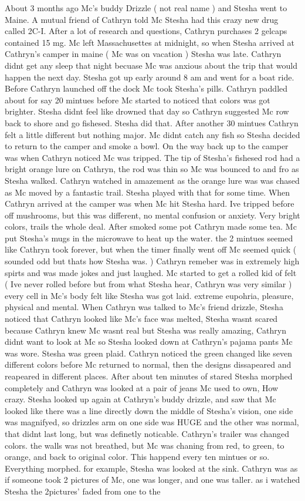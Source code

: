 \documentclass[12pt]{book}
\begin{document}
About 3 months ago Mc's buddy Drizzle ( not real name ) and Stesha went to Maine. A mutual friend of Cathryn told Mc Stesha had this crazy new drug called 2C-I. After a lot of research and questions, Cathryn purchases 2 gelcaps contained 15 mg. Mc left Massachusettes at midnight, so when Stesha arrived at Cathryn's camper in maine ( Mc was on vacation ) Stesha was late. Cathryn didnt get any sleep that night becuase Mc was anxious about the trip that would happen the next day. Stesha got up early around 8 am and went for a boat ride. Before Cathryn launched off the dock Mc took Stesha's pills. Cathryn paddled about for say 20 mintues before Mc started to noticed that colors was got brighter. Stesha didnt feel like drowned that day so Cathryn suggested Mc row back to shore and go fishesed. Stesha did that. After another 30 mintues Cathryn felt a little different but nothing major. Mc didnt catch any fish so Stesha decided to return to the camper and smoke a bowl. On the way back up to the camper was when Cathryn noticed Mc was tripped. The tip of Stesha's fishesed rod had a bright orange lure on Cathryn, the rod was thin so Mc was bounced to and fro as Stesha walked. Cathryn watched in amazement as the orange lure was was chased as Mc moved by a fantastic trail. Stesha played with that for some time. When Cathryn arrived at the camper was when Mc hit Stesha hard. Ive tripped before off mushrooms, but this was different, no mental confusion or anxiety. Very bright colors, trails the whole deal. After smoked some pot Cathryn made some tea. Mc put Stesha's mugs in the microwave to heat up the water. the 2 mintues seemed like Cathryn took forever, but when the timer finally went off Mc seemed quick ( sounded odd but thats how Stesha was. ) Cathryn remeber was in extremely high spirts and was made jokes and just laughed. Mc started to get a rolled kid of felt ( Ive never rolled before but from what Stesha hear, Cathryn was very similar ) every cell in Mc's body felt like Stesha was got laid. extreme eupohria, pleasure, physical and mental. When Cathryn was talked to Mc's friend drizzle, Stesha noticed that Cathryn looked like Mc's face was melted, Stesha wasnt scared because Cathryn knew Mc wasnt real but Stesha was really amazing, Cathryn didnt want to look at Mc so Stesha looked down at Cathryn's pajama pants Mc was wore. Stesha was green plaid. Cathryn noticed the green changed like seven different colors before Mc returned to normal, then the designs dissapeared and reapeared in different places. After about ten minutes of stared Stesha morphed completely and Cathryn was looked at a pair of jeans Mc used to own, How crazy. Stesha looked up again at Cathryn's buddy drizzle, and saw that Mc looked like there was a line directly down the middle of Stesha's vision, one side was magnifyed, so drizzles arm on one side was HUGE and the other was normal, that didnt last long, but was definetly noticable. Cathryn's trailer was changed colors. the walls was not breathed, but Mc was chaning from red, to green, to orange, and back to original color. This happend every ten mintues or so. Everything morphed. for example, Stesha was looked at the sink. Cathryn was as if someone took 2 pictures of Mc, one was longer, and one was taller. as i watched Stesha the 2pictures' faded from one to the 
\end{document}
